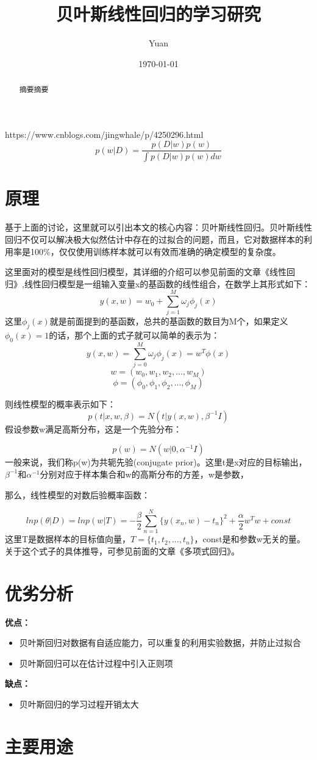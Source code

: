 \documentclass[12pt,a4paper,draft]{ctexart}
\title{贝叶斯线性回归的学习研究}
\author{Yuan}
\date{\today}
\begin{document}
\maketitle
\begin{abstract}
摘要摘要
\end{abstract}	
https://www.cnblogs.com/jingwhale/p/4250296.html
\[ p(w|D)=\frac{p(D|w)p(w)}{\int p(D|w)p(w)dw} \]
\section{原理}
基于上面的讨论，这里就可以引出本文的核心内容：贝叶斯线性回归。贝叶斯线性回归不仅可以解决极大似然估计中存在的过拟合的问题，而且，它对数据样本的利用率是100\%，仅仅使用训练样本就可以有效而准确的确定模型的复杂度。

这里面对的模型是线性回归模型，其详细的介绍可以参见前面的文章《线性回归》,线性回归模型是一组输入变量x的基函数的线性组合，在数学上其形式如下： 
\[ y(x,w)=w_{0}+\sum_{j=1}^{M}\omega_{j}\phi_{j}(x) \]
这里$ \phi_{j}(x) $就是前面提到的基函数，总共的基函数的数目为M个，如果定义$ \phi_{0}(x)=1 $的话，那个上面的式子就可以简单的表示为： 
\[ y(x,w)=\sum_{j=0}^{M}\omega_{j}\phi_{j}(x)=w^T\phi(x)\]
\[ w=(w_{0},w_{1},w_{2},...,w_{M})\]
\[ \phi=(\phi_{0},\phi_{1},\phi_{2},...,\phi_{M}) \]

则线性模型的概率表示如下：
\[ p(t|x,w,\beta)=N(t|y(x,w),\beta^{-1}I) \]
假设参数w满足高斯分布，这是一个先验分布：

\[ p(w)=N(w|0,\alpha^{-1}I) \]
一般来说，我们称p(w)为共轭先验(conjugate prior)。这里t是x对应的目标输出，$ \beta^{-1} $和$ \alpha^{-1} $分别对应于样本集合和w的高斯分布的方差，w是参数，

那么，线性模型的对数后验概率函数：

\[ ln p(\theta|D)=ln p(w|T)=-\frac{\beta}{2}\sum_{n=1}^N\{y(x_{n},w)-t_{n}\}^2+\frac{\alpha}{2}w^Tw+const \]
这里T是数据样本的目标值向量，$ T=\{t_1,t_2,...,t_n\} $，const是和参数w无关的量。关于这个式子的具体推导，可参见前面的文章《多项式回归》。
\section{优劣分析}
\noindent \textbf{优点：} 
\begin{itemize}
	\item 贝叶斯回归对数据有自适应能力，可以重复的利用实验数据，并防止过拟合 
	\item 贝叶斯回归可以在估计过程中引入正则项 
\end{itemize}
\noindent \textbf{缺点：} 
\begin{itemize}
	\item 贝叶斯回归的学习过程开销太大
\end{itemize}


\section{主要用途}
\end{document}

